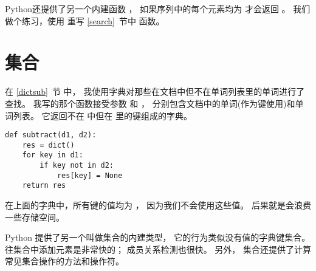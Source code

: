 Python还提供了另一个内建函数 ， 如果序列中的每个元素均为  才会返回  。 我们做个练习，使用  重写 \ref{search}~节中  函数。



\section{集合}
\label{sets}


在 \ref{dictsub}~节 中， 我使用字典对那些在文档中但不在单词列表里的单词进行了查找。
我写的那个函数接受参数  和  ， 分别包含文档中的单词(作为键使用)和单词列表。
它返回不在  中但在  里的键组成的字典。

\begin{lstlisting}
def subtract(d1, d2):
    res = dict()
    for key in d1:
        if key not in d2:
            res[key] = None
    return res
\end{lstlisting}


在上面的字典中，所有键的值均为  ， 因为我们不会使用这些值。  后果就是会浪费一些存储空间。


Python 提供了另一个叫做集合的内建类型， 它的行为类似没有值的字典键集合。
往集合中添加元素是非常快的； 成员关系检测也很快。
另外， 集合还提供了计算常见集合操作的方法和操作符。


